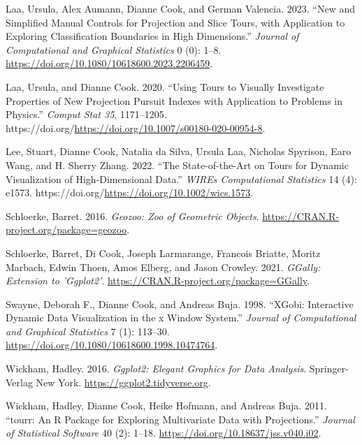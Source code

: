 \documentclass[
]{article}
\newlength{\cslhangindent}
\newlength{\cslentryspacingunit} %
\newenvironment{CSLReferences}[2] %
 {%
  \setlength{\parindent}{0pt}
  \ifodd #1
  \let\oldpar\par
  \def\par{\hangindent=\cslhangindent\oldpar}
  \fi
  \setlength{\parskip}{#2\cslentryspacingunit}
 }%
 {}
\begin{document}
\begin{CSLReferences}{1}{0}
\leavevmode{}%
Laa, Ursula, Alex Aumann, Dianne Cook, and German Valencia. 2023. {``New
and Simplified Manual Controls for Projection and Slice Tours, with
Application to Exploring Classification Boundaries in High
Dimensions.''} \emph{Journal of Computational and Graphical Statistics}
0 (0): 1--8. \url{https://doi.org/10.1080/10618600.2023.2206459}.

\leavevmode{}%
Laa, Ursula, and Dianne Cook. 2020. {``Using Tours to Visually
Investigate Properties of New Projection Pursuit Indexes with
Application to Problems in Physics.''} \emph{Comput Stat 35},
1171--1205.
https://doi.org/\url{https://doi.org/10.1007/s00180-020-00954-8}.

\leavevmode{}%
Lee, Stuart, Dianne Cook, Natalia da Silva, Ursula Laa, Nicholas
Spyrison, Earo Wang, and H. Sherry Zhang. 2022. {``The State-of-the-Art
on Tours for Dynamic Visualization of High-Dimensional Data.''}
\emph{WIREs Computational Statistics} 14 (4): e1573.
https://doi.org/\url{https://doi.org/10.1002/wics.1573}.

\leavevmode{}%
Schloerke, Barret. 2016. \emph{Geozoo: Zoo of Geometric Objects}.
\url{https://CRAN.R-project.org/package=geozoo}.

\leavevmode{}%
Schloerke, Barret, Di Cook, Joseph Larmarange, Francois Briatte, Moritz
Marbach, Edwin Thoen, Amos Elberg, and Jason Crowley. 2021.
\emph{GGally: Extension to 'Ggplot2'}.
\url{https://CRAN.R-project.org/package=GGally}.

\leavevmode{}%
Swayne, Deborah F., Dianne Cook, and Andreas Buja. 1998. {``XGobi:
Interactive Dynamic Data Visualization in the x Window System.''}
\emph{Journal of Computational and Graphical Statistics} 7 (1): 113--30.
\url{https://doi.org/10.1080/10618600.1998.10474764}.

\leavevmode{}%
Wickham, Hadley. 2016. \emph{Ggplot2: Elegant Graphics for Data
Analysis}. Springer-Verlag New York.
\url{https://ggplot2.tidyverse.org}.

\leavevmode{}%
Wickham, Hadley, Dianne Cook, Heike Hofmann, and Andreas Buja. 2011.
{``{tourr}: An {R} Package for Exploring Multivariate Data with
Projections.''} \emph{Journal of Statistical Software} 40 (2): 1--18.
\url{https://doi.org/10.18637/jss.v040.i02}.


\end{CSLReferences}
\end{document}
